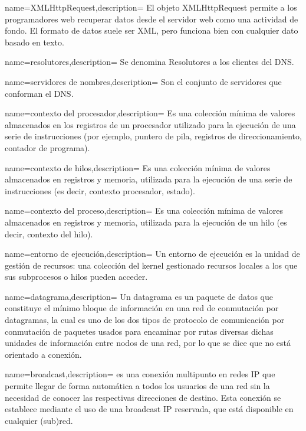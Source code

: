 {name={XMLHttpRequest},description= {El objeto XMLHttpRequest permite a los programadores web recuperar datos desde el servidor web como una actividad de fondo. El formato de datos suele ser XML, pero funciona bien con cualquier dato basado en texto.}}

{name={resolutores},description= {Se denomina Resolutores a los clientes del DNS.}}

{name={servidores de nombres},description= {Son el conjunto de servidores que conforman el DNS.}}

{name={contexto del procesador},description= {Es una colección mínima de valores almacenados en los registros de un procesador utilizado para la ejecución de una serie de instrucciones (por ejemplo, puntero de pila, registros de direccionamiento, contador de programa).}}


{name={contexto de hilos},description= {Es una colección mínima de valores almacenados en registros y memoria, utilizada para la ejecución de una serie de instrucciones (es decir, contexto procesador, estado).}}


{name={contexto del proceso},description= {Es una colección mínima de valores almacenados en registros y memoria, utilizada para la ejecución de un hilo (es decir, contexto del hilo).}}


{name={entorno de ejecuci\'on},description= {Un entorno de ejecución es la unidad de gestión de recursos: una colección del kernel gestionado recursos locales a los que sus subprocesos o hilos pueden acceder.}}

{name={datagrama},description= {Un datagrama es un paquete de datos que constituye el mínimo bloque de información en una red de conmutación por datagramas, la cual es uno de los dos tipos de protocolo de comunicación por conmutación de paquetes usados para encaminar por rutas diversas dichas unidades de información entre nodos de una red, por lo que se dice que no está orientado a conexión.}}

{name={broadcast},description= {es una conexión multipunto en redes IP que permite llegar de forma automática a todos los usuarios de una red sin la necesidad de conocer las respectivas direcciones de destino. Esta conexión se establece mediante el uso de una broadcast IP reservada, que está disponible en cualquier (sub)red.}}

